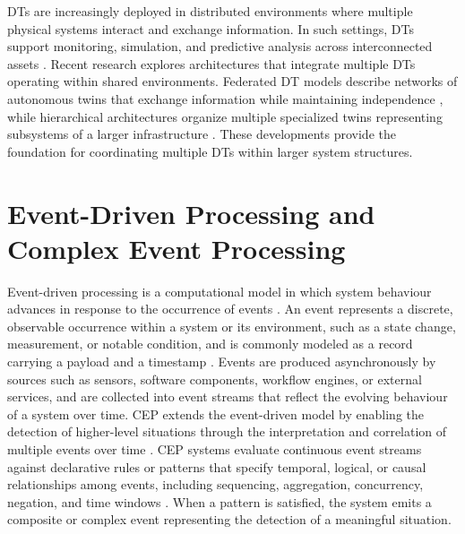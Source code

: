 DTs are increasingly deployed in distributed environments where multiple physical systems interact and exchange information. In such settings, DTs support monitoring, simulation, and predictive analysis across interconnected assets \cite{negri2017review, tao2018digital}. Recent research explores architectures that integrate multiple DTs operating within shared environments. Federated DT models describe networks of autonomous twins that exchange information while maintaining independence \cite{vergara2023federated}, while hierarchical architectures organize multiple specialized twins representing subsystems of a larger infrastructure \cite{kunnari2025distributed}. These developments provide the foundation for coordinating multiple DTs within larger system structures.



















\section{Event-Driven Processing and Complex Event Processing}\label{sec:background-cep}
Event-driven processing is a computational model in which system behaviour advances in response to the occurrence of events \cite{kommera2020power}. An event represents a discrete, observable occurrence within a system or its environment, such as a state change, measurement, or notable condition, and is commonly modeled as a record carrying a payload and a timestamp \cite{etzion2010event}. Events are produced asynchronously by sources such as sensors, software components, workflow engines, or external services, and are collected into event streams that reflect the evolving behaviour of a system over time. CEP extends the event-driven model by enabling the detection of higher-level situations through the interpretation and correlation of multiple events over time \cite{cugola2015complex}. CEP systems evaluate continuous event streams against declarative rules or patterns that specify temporal, logical, or causal relationships among events, including sequencing, aggregation, concurrency, negation, and time windows \cite{cugola2012processing,cugola2015complex}. When a pattern is satisfied, the system emits a composite or complex event representing the detection of a meaningful situation.

